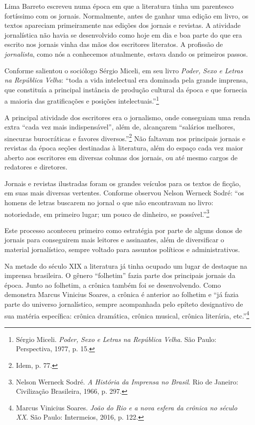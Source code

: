 Lima Barreto escreveu numa época em que a literatura tinha um parentesco
fortíssimo com os jornais. Normalmente, antes de ganhar uma edição em
livro, os textos apareciam primeiramente nas edições dos jornais e
revistas. A atividade jornalística não havia se desenvolvido como hoje
em dia e boa parte do que era escrito nos jornais vinha das mãos dos
escritores literatos. A profissão de \emph{jornalista}, como nós a
conhecemos atualmente, estava dando os primeiros passos.

Conforme salientou o sociólogo Sérgio Miceli, em seu livro \emph{Poder,
Sexo e Letras na República Velha}: ``toda a vida intelectual era
dominada pela grande imprensa, que constituía a principal instância de
produção cultural da época e que fornecia a maioria das gratificações e
posições intelectuais.''\footnote{Sérgio Miceli. \emph{Poder, Sexo e
  Letras na República Velha}. São Paulo: Perspectiva, 1977, p. 15.}

A principal atividade dos escritores era o jornalismo, onde conseguiam
uma renda extra ``cada vez mais indispensável'', além de, alcançarem
``salários melhores, sinecuras burocráticas e favores
diversos.''\footnote{Idem, p. 77.} Não faltavam nos principais jornais e
revistas da época seções destinadas à literatura, além do espaço cada
vez maior aberto aos escritores em diversas colunas dos jornais, ou até
mesmo cargos de redatores e diretores.

Jornais e revistas ilustradas foram os grandes veículos para os textos
de ficção, em suas mais diversas vertentes. Conforme observou Nelson
Werneck Sodré: ``os homens de letras buscarem no jornal o que não
encontravam no livro: notoriedade, em primeiro lugar; um pouco de
dinheiro, se possível.''\footnote{Nelson Werneck Sodré. \emph{A História
  da Imprensa no Brasil}. Rio de Janeiro: Civilização Brasileira, 1966,
  p. 297.}

Este processo aconteceu primeiro como estratégia por parte de alguns
donos de jornais para conseguirem mais leitores e assinantes, além de
diversificar o material jornalístico, sempre voltado para assuntos
políticos e administrativos.

Na metade do século XIX a literatura já tinha ocupado um lugar de
destaque na imprensa brasileira. O gênero ``folhetim'' fazia parte dos
principais jornais da época. Junto ao folhetim, a crônica também foi se
desenvolvendo. Como demonstra Marcus Vinicius Soares, a crônica é
anterior ao folhetim e ``já fazia parte do universo jornalístico, sempre
acompanhada pelo epíteto designativo de sua matéria específica: crônica
dramática, crônica musical, crônica literária, etc.''\footnote{Marcus
  Vinicius Soares. \emph{João do Rio e a nova esfera da crônica no
  século XX}. São Paulo: Intermeios, 2016, p. 122.}

